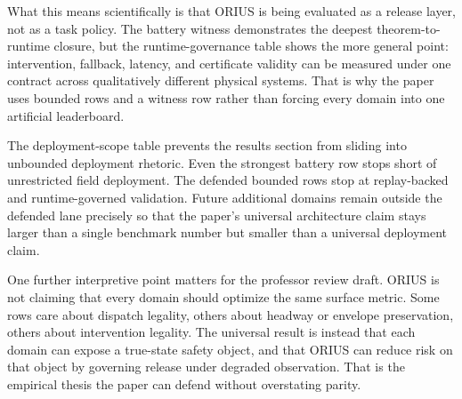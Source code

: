 What this means scientifically is that ORIUS is being evaluated as a release layer, not
as a task policy. The battery witness demonstrates the deepest theorem-to-runtime
closure, but the runtime-governance table shows the more general point: intervention,
fallback, latency, and certificate validity can be measured under one contract across
qualitatively different physical systems. That is why the paper uses bounded rows and a
witness row rather than forcing every domain into one artificial leaderboard.



The deployment-scope table prevents the results section from sliding into unbounded
deployment rhetoric. Even the strongest battery row stops short of unrestricted field
deployment. The defended bounded rows stop at replay-backed and runtime-governed
validation. Future additional domains remain outside the defended lane precisely so
that the paper's universal architecture claim stays larger than a single benchmark
number but smaller than a universal deployment claim.

One further interpretive point matters for the professor review draft. ORIUS is not
claiming that every domain should optimize the same surface metric. Some rows care about
dispatch legality, others about headway or envelope preservation, others about
intervention legality. The universal result is instead that each domain can expose a
true-state safety object, and that ORIUS can reduce risk on that object by governing
release under degraded observation. That is the empirical thesis the paper can defend
without overstating parity.
